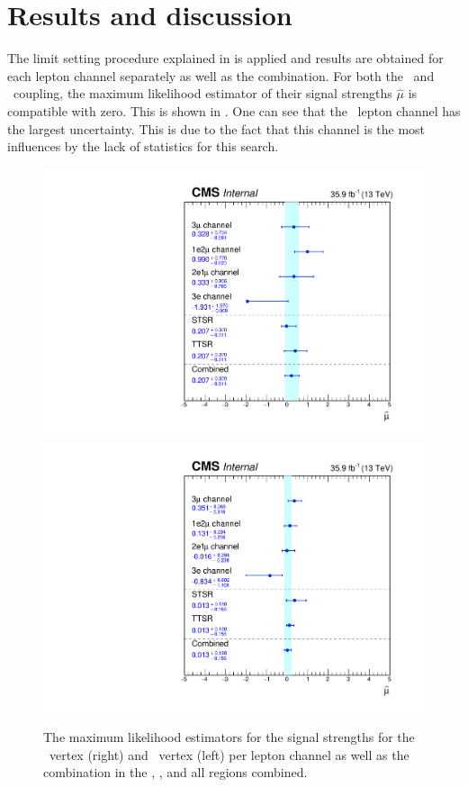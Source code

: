 \newpage
\section{Results and discussion}
The limit setting procedure explained in  is applied and results are obtained for each lepton channel separately as well as the combination. For both the \Zut\ and \Zct\ coupling, the maximum likelihood estimator of their signal strengths $\hat{\mu}$ is compatible with zero. This is shown in . One can see that the \eee\ lepton channel has the largest uncertainty. This is due to the fact that this channel is the most influences by the lack of statistics for this search.
\begin{figure}[htbp]
	\centering
	\includegraphics[width=0.49\linewidth]{6_Search/Figures/MLE/MLEZut.pdf}
	\includegraphics[width=0.49\linewidth]{6_Search/Figures/MLE/MLEZct.pdf}
	\caption{The maximum likelihood estimators for the signal strengths for the \Zut\ vertex (right) and \Zct\ vertex (left) per lepton channel as well as the combination in the \STSR, \TTSR, and all regions combined. }
	\label{fig:mlezut}
\end{figure}

